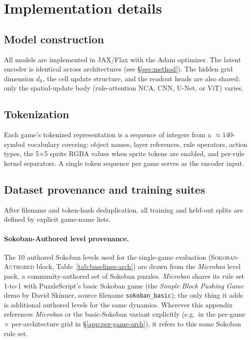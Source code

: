 \section{Implementation details}
\label{app:impl}

\subsection{Model construction}

All models are implemented in JAX/Flax with the Adam optimizer. The
latent encoder is identical across architectures (see
\S\ref{sec:method}). The hidden grid dimension $d_h$, the cell
update structure, and the readout heads are also shared; only the
spatial-update body (rule-attention NCA, CNN, U-Net, or ViT) varies.

\subsection{Tokenization}

Each game's tokenized representation is a sequence of integers from
a $\approx 140$-symbol vocabulary covering: object names, layer
references, rule operators, action types, the 5$\times$5 sprite RGBA
values when sprite tokens are enabled, and per-rule kernel
separators. A single token sequence per game serves as the encoder
input.

\subsection{Dataset provenance and training suites}
\label{app:data-provenance}

After filename and token-hash deduplication, all training and held-out
splits are defined by explicit game-name lists.

\paragraph{Sokoban-Authored level provenance.}
The 10 authored Sokoban levels used for the single-game evaluation
(\textsc{Sokoban-Authored} block, Table~\ref{tab:baselines-arch}) are drawn from the
\textit{Microban} level pack, a community-authored set of Sokoban
puzzles. \textit{Microban} shares its rule set 1-to-1 with
PuzzleScript's basic Sokoban game (the \textit{Simple Block Pushing
Game} demo by David Skinner, source filename \texttt{sokoban\_basic});
the only thing it adds is additional authored levels for the same
dynamics. Wherever this appendix references \textit{Microban} or the
basic-Sokoban variant explicitly (e.g.\ in the per-game $\times$
per-architecture grid in \S\ref{app:per-game-arch}), it refers to
this same Sokoban rule set.

